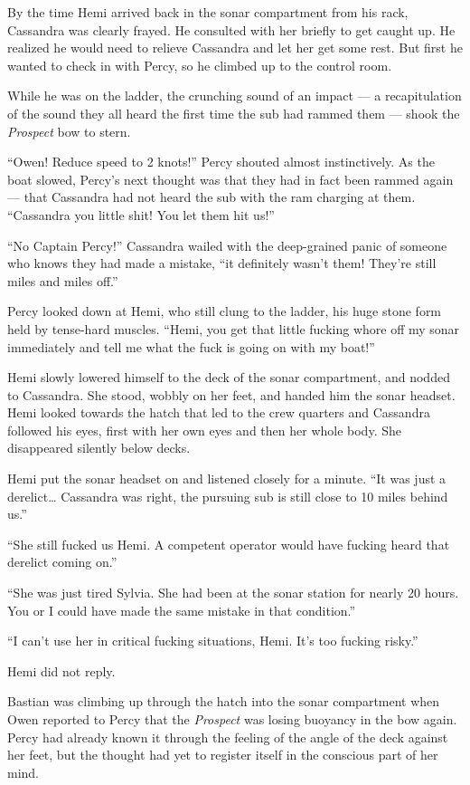\documentclass[
]{scrbook}
\begin{document}
By the time Hemi arrived back in the sonar compartment from his rack,
Cassandra was clearly frayed. He consulted with her briefly to get
caught up. He realized he would need to relieve Cassandra and let her
get some rest. But first he wanted to check in with Percy, so he climbed
up to the control room.

While he was on the ladder, the crunching sound of an impact --- a
recapitulation of the sound they all heard the first time the sub had
rammed them --- shook the \emph{Prospect} bow to stern.

``Owen! Reduce speed to 2 knots!'' Percy shouted almost instinctively.
As the boat slowed, Percy's next thought was that they had in fact been
rammed again --- that Cassandra had not heard the sub with the ram
charging at them. ``Cassandra you little shit! You let them hit us!''

``No Captain Percy!'' Cassandra wailed with the deep-grained panic of
someone who knows they had made a mistake, ``it definitely wasn't them!
They're still miles and miles off.''

Percy looked down at Hemi, who still clung to the ladder, his huge stone
form held by tense-hard muscles. ``Hemi, you get that little fucking
whore off my sonar immediately and tell me what the fuck is going on
with my boat!''

Hemi slowly lowered himself to the deck of the sonar compartment, and
nodded to Cassandra. She stood, wobbly on her feet, and handed him the
sonar headset. Hemi looked towards the hatch that led to the crew
quarters and Cassandra followed his eyes, first with her own eyes and
then her whole body. She disappeared silently below decks.

Hemi put the sonar headset on and listened closely for a minute. ``It
was just a derelict\ldots{} Cassandra was right, the pursuing sub is
still close to 10 miles behind us.''

``She still fucked us Hemi. A competent operator would have fucking
heard that derelict coming on.''

``She was just tired Sylvia. She had been at the sonar station for
nearly 20 hours. You or I could have made the same mistake in that
condition.''

``I can't use her in critical fucking situations, Hemi. It's too fucking
risky.''

Hemi did not reply.

Bastian was climbing up through the hatch into the sonar compartment
when Owen reported to Percy that the \emph{Prospect} was losing buoyancy
in the bow again. Percy had already known it through the feeling of the
angle of the deck against her feet, but the thought had yet to register
itself in the conscious part of her mind.
\end{document}
